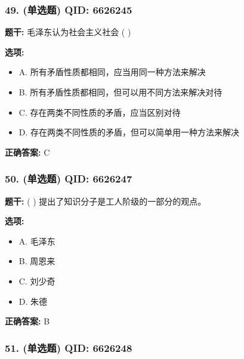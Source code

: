\documentclass[12pt,UTF8]{ctexart}
\begin{document}
\subsubsection*{49. (单选题) \small QID: 6626245}

\textbf{题干:}
毛泽东认为社会主义社会  ( )

\textbf{选项:}
\begin{itemize}[leftmargin=*]

  \item A. 所有矛盾性质都相同，应当用同一种方法来解决

  \item B. 所有矛盾性质都相同，但可以用不同方法来解决对待

  \item C. 存在两类不同性质的矛盾，应当区别对待

  \item D. 存在两类不同性质的矛盾，但可以简单用一种方法来解决

\end{itemize}

\textbf{正确答案:}
C

\vspace{0.3em}\hrulefill\vspace{0.7em}

\subsubsection*{50. (单选题) \small QID: 6626247}

\textbf{题干:}
( )  提出了知识分子是工人阶级的一部分的观点。

\textbf{选项:}
\begin{itemize}[leftmargin=*]

  \item A. 毛泽东

  \item B. 周恩来

  \item C. 刘少奇

  \item D. 朱德

\end{itemize}

\textbf{正确答案:}
B

\vspace{0.3em}\hrulefill\vspace{0.7em}

\subsubsection*{51. (单选题) \small QID: 6626248}
\end{document}

